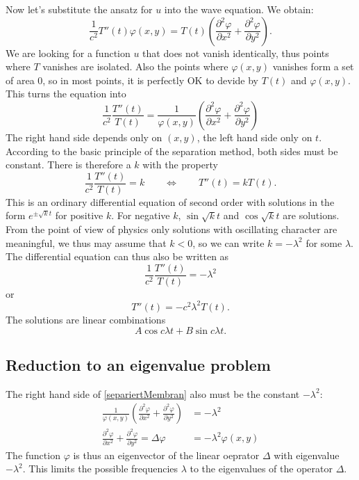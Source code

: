 Now let's substitute the ansatz for $u$ into the wave equation.
We obtain:
\[
\frac1{c^2}T''(t)\varphi(x,y)=T(t)\left(
\frac{\partial^2\varphi}{\partial x^2}
+
\frac{\partial^2\varphi}{\partial y^2}
\right).
\]
We are looking for a function $u$ that does not vanish identically,
thus points where $T$ vanishes are isolated.
Also the points where $\varphi(x,y)$ vanishes form a set of area $0$,
so in most points, it is perfectly OK to devide by $T(t)$ and
$\varphi(x,y)$.
This turns the equation into
\begin{equation}
\frac1{c^2}\frac{T''(t)}{T(t)}
= \frac1{\varphi(x,y)}\left( \frac{\partial^2\varphi}{\partial x^2}
+ \frac{\partial^2\varphi}{\partial y^2} \right)
\label{separiertMembran}
\end{equation}
The right hand side depends only on $(x,y)$, the left hand side only on $t$.
According to the basic principle of the separation method, both sides
must be constant.
There is therefore a $k$ with the property
\[
\frac1{c^2}\frac{T''(t)}{T(t)}=k
\qquad\Leftrightarrow\qquad
T''(t)=k T(t).
\]
This is an ordinary differential equation of second order with solutions
in the form
$e^{\pm\sqrt{k}t}$ for positive $k$.
For negative $k$, $\sin\sqrt{k}t$ and $\cos\sqrt{k}t$ are solutions.
From the point of view of physics only solutions with oscillating
character are meaningful, we thus may assume that $k<0$, so we can
write $k=-\lambda^2$ for some $\lambda$.
The differential equation can thus also be written as
\[
\frac1{c^2}\frac{T''(t)}{T(t)}=-\lambda^2
\]
or
\[
T''(t)=-c^2\lambda^2 T(t).
\]
The solutions are linear combinations 
\[
A\cos c\lambda t+B\sin c\lambda t.
\]

\subsection{Reduction to an eigenvalue problem}
The right hand side of \eqref{separiertMembran}
also must be the constant $-\lambda^2$:
\begin{align*}
\frac1{\varphi(x,y)}\left(
\frac{\partial^2\varphi}{\partial x^2}
+
\frac{\partial^2\varphi}{\partial y^2}
\right)&=-\lambda^2\\
\frac{\partial^2\varphi}{\partial x^2}
+
\frac{\partial^2\varphi}{\partial y^2}
=
\Delta\varphi
&=-\lambda^2
\varphi(x,y)
\end{align*}
The function $\varphi$ is thus an eigenvector of the linear 
oeprator $\Delta$ with eigenvalue $-\lambda^2$.
This limits the possible frequencies $\lambda$ to the eigenvalues
of the operator $\Delta$.

